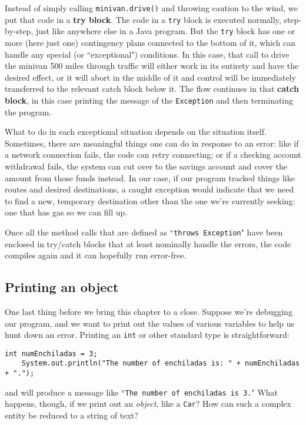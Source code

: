 Instead of simply calling \texttt{minivan.drive()} and throwing caution to the
wind, we put that code in a \textbf{try block}. The code in a \texttt{try}
block is executed normally, step-by-step, just like anywhere else in a Java
program. But the \texttt{try} block has one or more (here just one)
contingency plans connected to the bottom of it, which can handle any special
(or ``exceptional") conditions. In this case, that call to drive the minivan
500 miles through traffic will either work in its entirety and have the
desired effect, or it will abort in the middle of it and control will be
immediately transferred to the relevant catch block below it. The flow
continues in that \textbf{catch block}, in this case printing the message of
the \texttt{Exception} and then terminating the program.

What to do in each exceptional situation depends on the situation itself.
Sometimes, there are meaningful things one can do in response to an error:
like if a network connection fails, the code can retry connecting; or if a
checking account withdrawal fails, the system can cut over to the savings
account and cover the amount from those funds instead. In our case, if our
program tracked things like routes and desired destinations, a caught
exception would indicate that we need to find a new, temporary destination
other than the one we're currently seeking: one that has gas so we can fill
up.

Once all the method calls that are defined as ``\texttt{throws Exception}"
have been enclosed in try/catch blocks that at least nominally handle the
errors, the code compiles again and it can hopefully run error-free.

\subsection{Printing an object}

One last thing before we bring this chapter to a close. Suppose we're
debugging our program, and we want to print out the values of various
variables to help us hunt down an error. Printing an \texttt{int} or other
standard type is straightforward:

\begin{Verbatim}[samepage=true,fontsize=\scriptsize,frame=single]
    int numEnchiladas = 3;
    System.out.println("The number of enchiladas is: " + numEnchiladas + ".");
\end{Verbatim}

and will produce a message like ``\texttt{The number of enchiladas is 3.}"
What happens, though, if we print out an \textit{object}, like a \texttt{Car}?
How can such a complex entity be reduced to a string of text?


